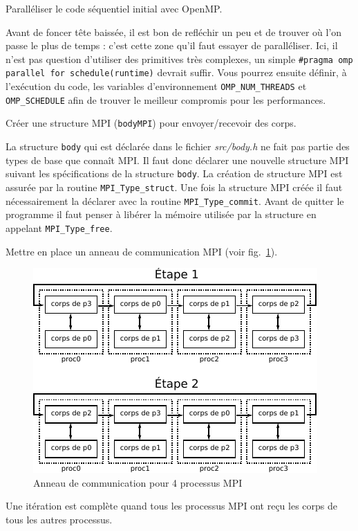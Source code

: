 \begin{questions}
	\question Paralléliser le code séquentiel initial avec OpenMP.
	\begin{solution}
		Avant de foncer tête baissée, il est bon de refléchir un peu et de trouver où l'on passe le plus de temps : c'est cette zone qu'il faut essayer de paralléliser.
		Ici, il n'est pas question d'utiliser des primitives très complexes, un simple \texttt{\#pragma omp parallel for schedule(runtime)} devrait suffir.
		Vous pourrez ensuite définir, à l'exécution du code, les variables d'environnement \texttt{OMP\_NUM\_THREADS} et \texttt{OMP\_SCHEDULE} afin de trouver le meilleur compromis pour les performances. 
	\end{solution}
	\question Créer une structure MPI (\texttt{bodyMPI}) pour envoyer/recevoir des corps.
	\begin{solution}
		La structure \texttt{body} qui est déclarée dans le fichier \textit{src/body.h} ne fait pas partie des types de base que connaît MPI.
		Il faut donc déclarer une nouvelle structure MPI suivant les spécifications de la structure \texttt{body}.
		La création de structure MPI est assurée par la routine \texttt{MPI\_Type\_struct}.
		Une fois la structure MPI créée il faut nécessairement la déclarer avec la routine \texttt{MPI\_Type\_commit}.
		Avant de quitter le programme il faut penser à libérer la mémoire utilisée par la structure en appelant \texttt{MPI\_Type\_free}.
	\end{solution}
	\question Mettre en place un anneau de communication MPI (voir fig.~\ref{fig:anneau}).
	\begin{figure}[htbp]
		\centering
		\includegraphics[width=0.6\linewidth]{schemas/anneau_sans_buffering.pdf}
		\caption{Anneau de communication pour 4 processus MPI}
		\label{fig:anneau}
	\end{figure}
	\begin{solution}
		Une itération est complète quand tous les processus MPI ont reçu les corps de tous les autres processus.

\end{solution}
\end{questions}
